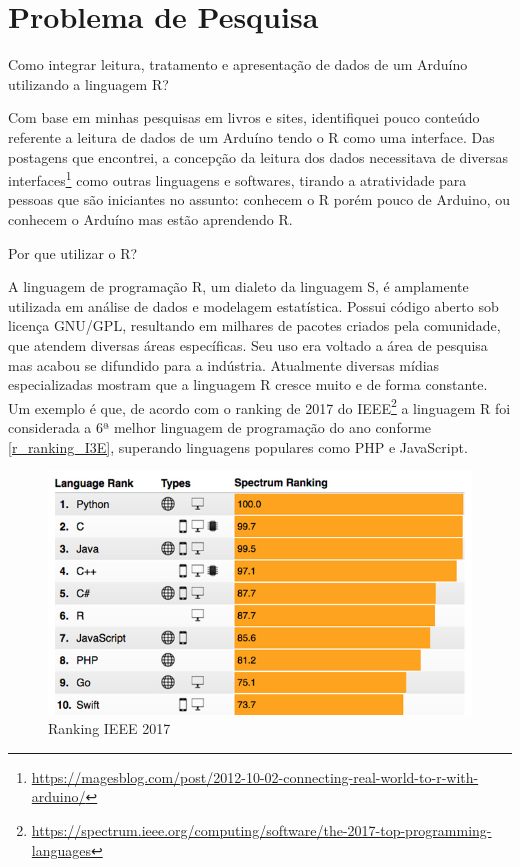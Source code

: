 \chapter*[Problema de Pesquisa]{Problema de Pesquisa}

Como integrar leitura, tratamento e apresentação de dados de um Arduíno 
utilizando a linguagem R? 

Com base em minhas pesquisas em livros e sites, identifiquei 
pouco conteúdo referente a leitura de dados de um Arduíno tendo o R como uma
interface. Das postagens que encontrei, a concepção da leitura dos dados 
necessitava de diversas 
interfaces\footnote{\url{https://magesblog.com/post/2012-10-02-connecting-real-world-to-r-with-arduino/}}
como outras linguagens e softwares, tirando a atratividade para pessoas que são 
iniciantes no assunto: conhecem o R porém pouco de Arduino, ou conhecem o 
Arduíno mas estão aprendendo R.

Por que utilizar o R?

A linguagem de programação R, um dialeto da linguagem 
S, é amplamente utilizada em análise de dados e modelagem estatística. Possui 
código aberto sob licença GNU/GPL, resultando em milhares de pacotes criados 
pela comunidade, que atendem diversas áreas específicas. Seu uso era voltado 
a área de pesquisa mas acabou se difundido para a indústria. Atualmente 
diversas mídias especializadas mostram que a linguagem R cresce muito e de 
forma constante. Um exemplo é que, de acordo com o ranking de 2017 do 
IEEE\footnote{\url{https://spectrum.ieee.org/computing/software/the-2017-top-programming-languages}}
a linguagem R foi considerada a 6ª melhor linguagem de programação do ano conforme 
\autoref{r_ranking_I3E}, superando linguagens populares como PHP e 
JavaScript.

\begin{figure}[htb]
 \caption{\label{r_ranking_I3E} Ranking IEEE 2017}
 \begin{center}
  \includegraphics[scale = 0.4]{img/r_ranking_I3E.jpeg}
 \end{center}
\end{figure}

